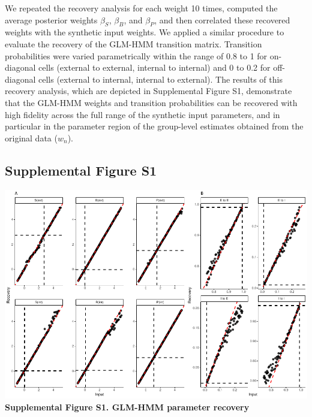 \documentclass[
]{article}
\begin{document}
We repeated the recovery analysis for each weight 10 times, computed the
average posterior weights \(\beta_S\), \(\beta_B\), and \(\beta_P\), and
then correlated these recovered weights with the synthetic input
weights. We applied a similar procedure to evaluate the recovery of the
GLM-HMM transition matrix. Transition probabilities were varied
parametrically within the range of 0.8 to 1 for on-diagonal cells
(external to external, internal to internal) and 0 to 0.2 for
off-diagonal cells (external to internal, internal to external). The
results of this recovery analysis, which are depicted in Supplemental
Figure S1, demonstrate that the GLM-HMM weights and transition
probabilities can be recovered with high fidelity across the full range
of the synthetic input parameters, and in particular in the parameter
region of the group-level estimates obtained from the original data
(\(w_n\)).

\subsection{Supplemental Figure S1}\label{supplemental-figure-s1}

\includegraphics{modes_ketamine_scz_files/figure-latex/Supplemental_Figure_S1-1.pdf}
\textbf{Supplemental Figure S1. GLM-HMM parameter recovery}
\end{document}
